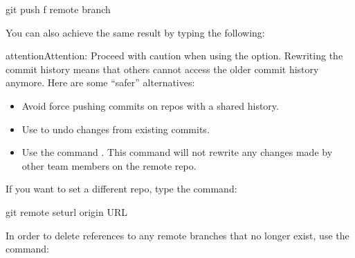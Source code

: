 \documentclass[a4paper,10pt,english,openany,oneside]{sphinxmanual}
\begin{document}
\begin{sphinxVerbatim}[commandchars=\\\{\}]
\PYGZdl{} git push \PYGZhy{}f \PYGZlt{}remote\PYGZgt{} \PYGZlt{}branch\PYGZgt{}
\end{sphinxVerbatim}

\sphinxAtStartPar
You can also achieve the same result by typing the following:

\begin{sphinxVerbatim}[commandchars=\\\{\}]
    
\end{sphinxVerbatim}

\begin{sphinxadmonition}{attention}{Attention:}
\sphinxAtStartPar
Proceed with caution when using the  option. Rewriting the commit history means that others cannot access the older commit history anymore. Here are some “safer” alternatives:
\begin{itemize}
\item {} 
\sphinxAtStartPar
Avoid force pushing commits on repos with a shared history.

\item {} 
\sphinxAtStartPar
Use  to undo changes from existing commits.

\item {} 
\sphinxAtStartPar
Use the command . This command will not rewrite any changes made by other team members on the remote repo.

\end{itemize}
\end{sphinxadmonition}

\sphinxAtStartPar
If you want to set a different repo, type the command:

\begin{sphinxVerbatim}[commandchars=\\\{\}]
\PYGZdl{} git remote set\PYGZhy{}url origin \PYGZlt{}URL\PYGZgt{}
\end{sphinxVerbatim}

\sphinxAtStartPar
In order to delete references to any remote branches that no longer exist, use the command:
\end{document}
